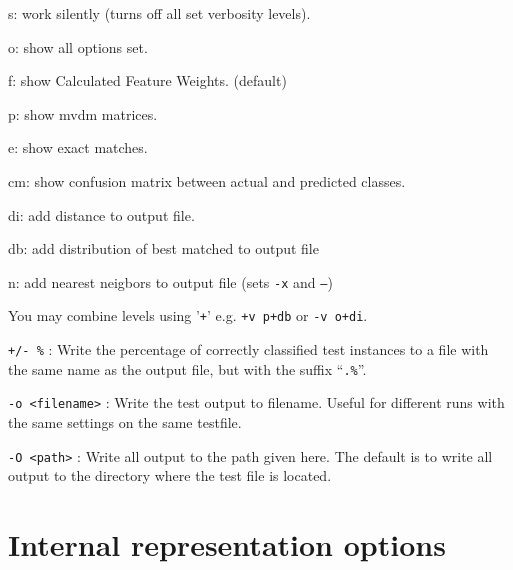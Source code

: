 \documentclass{report}
\begin{document}
\begin{description}
	\begin{description}
         \item s:  work silently (turns off all set verbosity levels).
         \item o:  show all options set.
         \item f:  show Calculated Feature Weights. (default)
         \item p:  show {\sc mvdm} matrices.
         \item e:  show exact matches.
	 \item cm: show confusion matrix between actual and predicted classes.
         \item di: add distance to output file.
         \item db: add distribution of best matched to output file
         \item n:  add nearest neigbors to output file (sets {\tt -x}
         and {\tt --})
	\item You may combine levels using '{\tt +}' e.g. {\tt +v
         p+db} or {\tt -v o+di}.
	\end{description}

\item {\tt +/- \%} : Write the percentage of correctly classified test
                 instances to a file with the same name as the output
                 file, but with the suffix ``{\tt .\%}''.

\item {\tt -o <filename>} : Write the test output to filename. Useful
for different runs with the same settings on the same testfile.

\item {\tt -O <path>} : Write all output to the path given here. The
default is to write all output to the directory where the test file
is located.

\end{description}

\section{Internal representation options}
\end{document}

